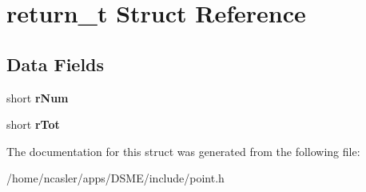 \hypertarget{structreturn__t}{}\section{return\+\_\+t Struct Reference}
\label{structreturn__t}
\subsection*{Data Fields}
\begin{DoxyCompactItemize}
\item 
\hypertarget{structreturn__t_a6b36ad9f257a1ea90eeab16eff15796a}{}short {\bfseries r\+Num}\label{structreturn__t_a6b36ad9f257a1ea90eeab16eff15796a}

\item 
\hypertarget{structreturn__t_ae89626627a292c16de890c25378cc5c3}{}short {\bfseries r\+Tot}\label{structreturn__t_ae89626627a292c16de890c25378cc5c3}

\end{DoxyCompactItemize}


The documentation for this struct was generated from the following file\+:\begin{DoxyCompactItemize}
\item 
/home/ncasler/apps/\+D\+S\+M\+E/include/point.\+h\end{DoxyCompactItemize}
